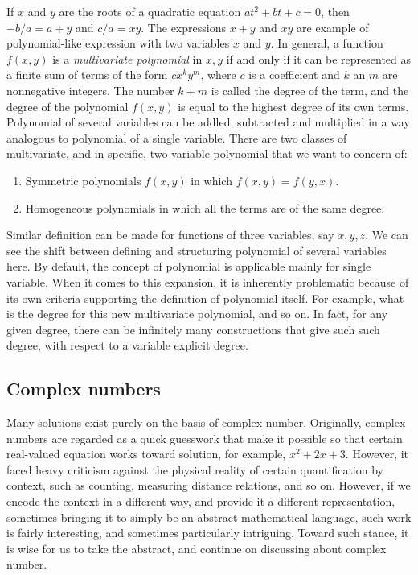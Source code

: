 If $x$ and $y$ are the roots of a quadratic equation $at^{2}+bt+c=0$, then $-b/a=a+y$ and $c/a=xy$. The expressions $x+y$ and $xy$ are example of polynomial-like expression with two variables $x$ and $y$. In general, a function $f(x,y)$ is a \textit{multivariate polynomial} in $x,y$ if and only if it can be represented as a finite sum of terms of the form $cx^{k}y^{m}$, where $c$ is a coefficient and $k$ an $m$ are nonnegative integers. The number $k+m$ is called the degree of the term, and the degree of the polynomial $f(x,y)$ is equal to the highest degree of its own terms. Polynomial of several variables can be addled, subtracted and multiplied in a way analogous to polynomial of a single variable. There are two classes of multivariate, and in specific, two-variable polynomial that we want to concern of: 
\begin{enumerate}[label=\roman*]
    \item Symmetric polynomials $f(x,y)$ in which $f(x,y)=f(y,x)$. 
    \item Homogeneous polynomials in which all the terms are of the same degree. 
\end{enumerate} 
Similar definition can be made for functions of three variables, say $x,y,z$. We can see the shift between defining and structuring polynomial of several variables here. By default, the concept of polynomial is applicable mainly for single variable. When it comes to this expansion, it is inherently problematic because of its own criteria supporting the definition of polynomial itself. For example, what is the degree for this new multivariate polynomial, and so on. In fact, for any given degree, there can be infinitely many constructions that give such such degree, with respect to a variable explicit degree. 
\subsection{Complex numbers}
Many solutions exist purely on the basis of complex number. Originally, complex numbers are regarded as a quick guesswork that make it possible so that certain real-valued equation works toward solution, for example, $x^{2}+2x+3$. However, it faced heavy criticism against the physical reality of certain quantification by context, such as counting, measuring distance relations, and so on. However, if we encode the context in a different way, and provide it a different representation, sometimes bringing it to simply be an abstract mathematical language, such work is fairly interesting, and sometimes particularly intriguing. Toward such stance, it is wise for us to take the abstract, and continue on discussing about complex number. 

